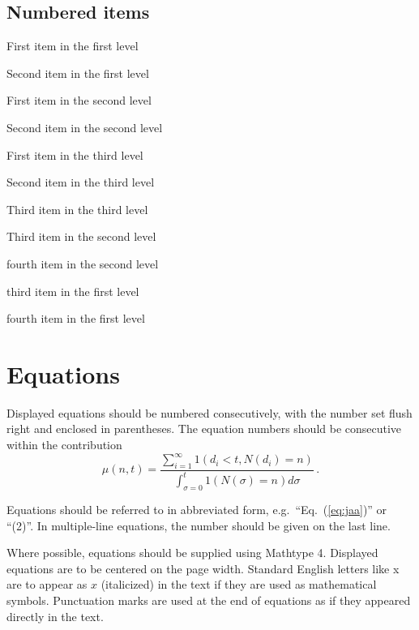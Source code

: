 \documentclass{IJCS_template}
\begin{document}
\subsection*{Numbered items}

\begin{arabiclist}
\item First item in the first level
\item Second item in the first level
\begin{alphlist}[(a)]
\item First item in the second level
\item Second item in the second level
\begin{romanlist}[iii.]
\item First item in the third level
\item Second item in the third level
\item Third item in the third level
\end{romanlist}
\item Third item in the second level
\item fourth item in the second level
\end{alphlist}
\item third item in the first level
\item fourth item in the first level
\end{arabiclist}

\section{Equations}
Displayed equations should be numbered consecutively, with the number
set flush right and enclosed in parentheses. The equation numbers
should be consecutive within the contribution
\begin{equation}
\mu(n, t) = \frac{\sum^\infty_{i=1} 1(d_i < t, N(d_i)
= n)}{\int^t_{\sigma=0} 1(N(\sigma) = n)d\sigma}\,.
\label{eq:jaa}
\end{equation}

Equations should be referred to in abbreviated form,
e.g.~``Eq.~(\ref{eq:jaa})'' or ``(2)''. In multiple-line equations,
the number should be given on the last line.

Where possible, equations should be supplied using Mathtype 4.
Displayed equations are to be centered on the page width.  Standard
English letters like x are to appear as $x$ (italicized) in the text
if they are used as mathematical symbols. Punctuation marks are used
at the end of equations as if they appeared directly in the text.
\end{document}
